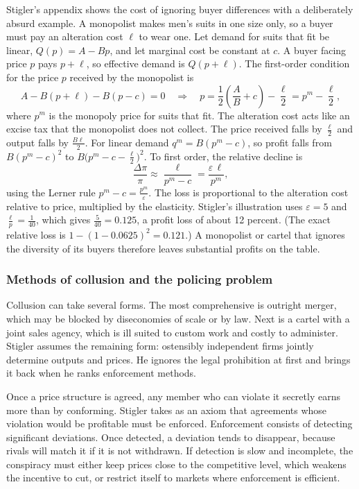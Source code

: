 Stigler's appendix shows the cost of ignoring buyer differences with a deliberately absurd example. A monopolist
makes men's suits in one size only, so a buyer must pay an alteration cost $\ell$ to wear one. Let demand for suits
that fit be linear, $Q(p) = A - Bp$, and let marginal cost be constant at $c$. A buyer facing price $p$ pays
$p + \ell$, so effective demand is $Q(p + \ell)$. The first-order condition for the price $p$ received by the
monopolist is
\begin{equation*}
A - B(p + \ell) - B(p - c) = 0
\quad\Longrightarrow\quad
p = \frac{1}{2}\left(\frac{A}{B} + c\right) - \frac{\ell}{2} = p^m - \frac{\ell}{2},
\end{equation*}
where $p^m$ is the monopoly price for suits that fit. The alteration cost acts like an excise tax that the
monopolist does not collect. The price received falls by $\frac{\ell}{2}$ and output falls by $\frac{B\ell}{2}$. For
linear demand $q^m = B(p^m - c)$, so profit falls from $B(p^m - c)^2$ to $B\bigl(p^m - c - \frac{\ell}{2}\bigr)^2$.
To first order, the relative decline is
\begin{equation*}
\frac{\Delta \pi}{\pi} \approx \frac{\ell}{p^m - c} = \frac{\varepsilon\,\ell}{p^m},
\end{equation*}
using the Lerner rule $p^m - c = \frac{p^m}{\varepsilon}$. The loss is proportional to the alteration cost relative
to price, multiplied by the elasticity. Stigler's illustration uses $\varepsilon = 5$ and $\frac{\ell}{p} = \frac{1}{40}$,
which gives $\frac{5}{40} = 0.125$, a profit loss of about 12 percent. (The exact relative loss is
$1 - (1 - 0.0625)^2 = 0.121$.) A monopolist or cartel that ignores the diversity of its buyers therefore leaves
substantial profits on the table.

\subsubsection{Methods of collusion and the policing problem}

Collusion can take several forms. The most comprehensive is outright merger, which may be blocked by
diseconomies of scale or by law. Next is a cartel with a joint sales agency, which is ill suited to custom work
and costly to administer. Stigler assumes the remaining form: ostensibly independent firms jointly determine
outputs and prices. He ignores the legal prohibition at first and brings it back when he ranks enforcement methods.

Once a price structure is agreed, any member who can violate it secretly earns more than by conforming. Stigler
takes as an axiom that agreements whose violation would be profitable must be enforced. Enforcement consists of
detecting significant deviations. Once detected, a deviation tends to disappear, because rivals will match it if it
is not withdrawn. If detection is slow and incomplete, the conspiracy must either keep prices close to the
competitive level, which weakens the incentive to cut, or restrict itself to markets where enforcement is
efficient.


